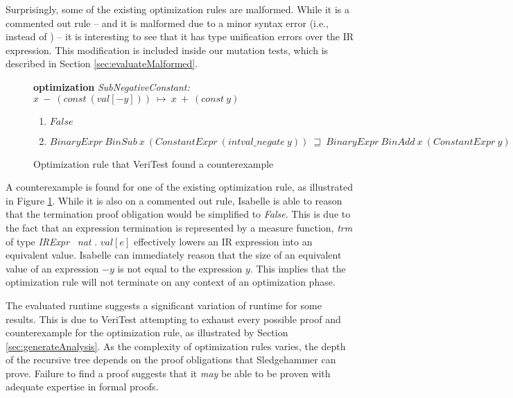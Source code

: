 Surprisingly, some of the existing optimization rules are malformed. While it is a commented out rule -- and it is malformed due to a minor 
syntax error (i.e.,  instead of ) -- it is interesting to see that it has type unification errors over the IR 
expression. This modification is included inside our mutation tests, which is described in Section \ref{sec:evaluateMalformed}.

\begin{figure}[!htb]
    \textbf{optimization} \emph{SubNegativeConstant: \(x\ -\ (const\ (val[-y]))\ \longmapsto\ x\ +\ (const\ y)\)}
    \begin{enumerate}
        \item \(False\)
        \item \(BinaryExpr\ BinSub\ x\ (ConstantExpr\ (intval\_negate\ y))\ \sqsupseteq\ BinaryExpr\ BinAdd\ x\ (ConstantExpr\ y)\)
    \end{enumerate}

    \caption{Optimization rule that VeriTest found a counterexample}
    \label{fig:exampleCounterexample}
\end{figure}

A counterexample is found for one of the existing optimization rule, as illustrated in Figure \ref{fig:exampleCounterexample}. 
While it is also on a commented out rule, Isabelle is able to reason that the termination proof obligation would be simplified to 
\emph{False}. This is due to the fact that an expression termination is represented by a measure function, \emph{trm} of type 
\emph{IRExpr} \Rightarrow\ \emph{nat} \cite[Sec. 3.3]{Term_Graph_Optimizations}. \(val[e]\) effectively lowers an IR expression into an 
equivalent value. Isabelle can immediately reason that the size of an equivalent value of an expression \(-y\) is not equal to the expression \(y\). 
This implies that the optimization rule will not terminate on any context of an optimization phase.

The evaluated runtime suggests a significant variation of runtime for some results.
This is due to VeriTest attempting to exhaust every possible proof and counterexample for the optimization rule, as illustrated by Section 
\ref{sec:generateAnalysis}. As the complexity of optimization rules varies, the depth of the recursive tree depends on the proof obligations that 
Sledgehammer can prove. Failure to find a proof suggests that it \emph{may} be able to be proven with adequate expertise in formal proofs.

